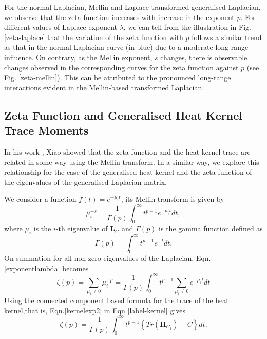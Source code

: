 \documentclass[10pt,a4paper]{article}
\theoremstyle{plain}
\theoremstyle{definition}
\begin{document}
    For the normal Laplacian, Mellin and Laplace transformed generalised Laplacian, we observe that the zeta function increases with increase in the exponent $p$. For different values of Laplace exponent $\lambda$, we can tell from the illustration in Fig.\ref{zeta-laplace} that the variation of the zeta function with $p$ follows a similar trend as that in the normal Laplacian curve (in blue) due to a moderate long-range influence. On contrary, as the Mellin exponent, $s$ changes, there is observable changes observed in the corresponding curves for the zeta function against $p$ (see Fig. \ref{zeta-mellin}). This can be attributed to the pronounced long-range interactions evident in the Mellin-based transformed Laplacian.
    
    \subsection{Zeta Function and Generalised Heat Kernel Trace Moments}
     In his work \citep{xiao2009graph}, Xiao showed that the zeta function and the heat kernel trace are related in some way using the Mellin transform. In a similar way, we explore this relationship for the case of the generalised heat kernel and the zeta function of the eigenvalues of the generalised Laplacian matrix.
    
    We consider a function $f(t)=e^{-\mu_i t}$, its Mellin transform is given by
    \begin{equation}
    \mu_i ^{-s} = \frac{1}{\Gamma(p)} \int_{0}^{\infty} t^{p-1} e^{-\mu_i t} dt,
    \label{exponentlambda}
    \end{equation}
    where $\mu_i$ is the $i$-th eigenvalue of $\mathbf{L}_G$ and $\Gamma(p)$ is the gamma function defined as 
    \begin{equation}
    \Gamma(p) = \int_{0}^{\infty} t^{p-1} e^{-t} dt.
    \end{equation}
    On summation for all non-zero eigenvalues of the Laplacian, Eqn.\ref{exponentlambda} becomes
    \begin{equation}
    \zeta(p) = \sum_{\mu_i \neq 0} \mu_i ^{-p} = \frac{1}{\Gamma(p)} \int_{0}^{\infty} t^{p-1} \sum_{\mu_i \neq 0} e^{-\mu_i t} dt
    \label{label-kernel}
    \end{equation}
    Using the connected component based formula for the trace of the heat kernel,that is, Eqn.\ref{kernelexp2} in Eqn \ref{label-kernel} gives
    \begin{equation}
    \zeta(p) = \frac{1}{\Gamma(p)} \int_{0}^{\infty} t^{p-1} \left \{ Tr(\mathbf{H}_{G_t})-C \right \} dt.
    \end{equation}
    
\end{document}
